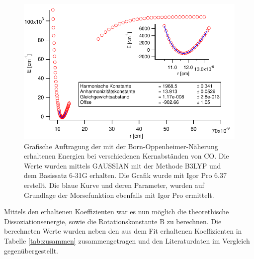 \begin{figure}[H]
	\centering	
	\begin{minipage}{1\textwidth}
	\includegraphics[width=\columnwidth]{Bilder/Graph2.pdf}
	\end{minipage}
	
	
	\caption{Grafische Auftragung der mit der Born-Oppenheimer-Näherung erhaltenen Energien bei verschiedenen Kernabständen von CO. Die Werte wurden mittels GAUSSIAN mit der Methode B3LYP und dem Basissatz 6-31G erhalten. Die Grafik wurde mit Igor Pro 6.37 erstellt. Die blaue Kurve und deren Parameter, wurden auf Grundlage der Morsefunktion ebenfalls mit Igor Pro ermittelt.}
	
	
	\label{COplot}
\end{figure}






Mittels den erhaltenen Koeffizienten war es nun möglich die theorethische Dissoziationsenergie, sowie die Rotationskonstante B zu berechnen. Die berechneten Werte wurden neben den aus dem Fit erhaltenen Koeffizienten in Tabelle \ref{tab:zusammen} zusammengetragen und den Literaturdaten im Vergleich gegenübergestellt.


